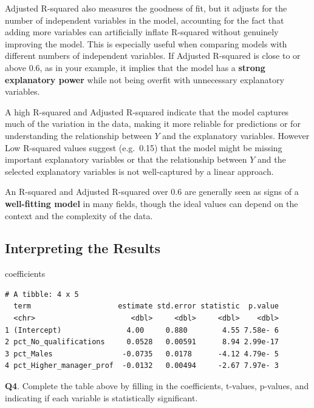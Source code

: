 \documentclass[
  letterpaper,
  DIV=11,
  numbers=noendperiod]{scrreprt}
\newenvironment{Shaded}{\begin{snugshade}}{\end{snugshade}}
\newcommand{\NormalTok}[1]{\textcolor[rgb]{0.00,0.23,0.31}{#1}}
\begin{document}
Adjusted R-squared also measures the goodness of fit, but it adjusts for
the number of independent variables in the model, accounting for the
fact that adding more variables can artificially inflate R-squared
without genuinely improving the model. This is especially useful when
comparing models with different numbers of independent variables. If
Adjusted R-squared is close to or above 0.6, as in your example, it
implies that the model has a \textbf{strong explanatory power} while not
being overfit with unnecessary explanatory variables.

A high R-squared and Adjusted R-squared indicate that the model captures
much of the variation in the data, making it more reliable for
predictions or for understanding the relationship between \(Y\) and the
explanatory variables. However Low R-squared values suggest (e.g.~0.15)
that the model might be missing important explanatory variables or that
the relationship between \(Y\) and the selected explanatory variables is
not well-captured by a linear approach.

An R-squared and Adjusted R-squared over 0.6 are generally seen as signs
of a \textbf{well-fitting model} in many fields, though the ideal values
can depend on the context and the complexity of the data.

\subsection{Interpreting the Results}\label{interpreting-the-results}

\begin{Shaded}
\begin{Highlighting}[]
\NormalTok{coefficients}
\end{Highlighting}
\end{Shaded}

\begin{verbatim}
# A tibble: 4 x 5
  term                    estimate std.error statistic  p.value
  <chr>                      <dbl>     <dbl>     <dbl>    <dbl>
1 (Intercept)               4.00     0.880        4.55 7.58e- 6
2 pct_No_qualifications     0.0528   0.00591      8.94 2.99e-17
3 pct_Males                -0.0735   0.0178      -4.12 4.79e- 5
4 pct_Higher_manager_prof  -0.0132   0.00494     -2.67 7.97e- 3
\end{verbatim}

\textbf{Q4}. Complete the table above by filling in the coefficients,
t-values, p-values, and indicating if each variable is statistically
significant.
\end{document}

